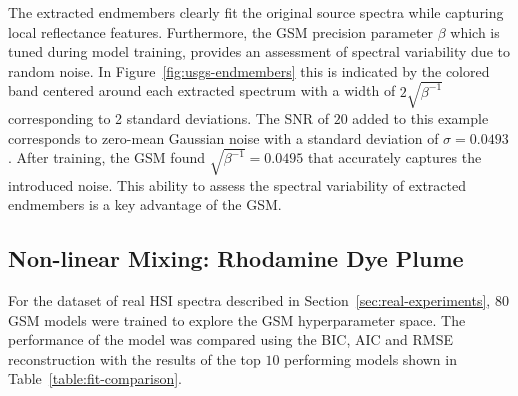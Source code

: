 The extracted endmembers clearly fit the original source spectra while capturing
local reflectance features. Furthermore, the GSM precision parameter $\beta$
which is tuned during model training, provides an assessment of spectral
variability due to random noise. In Figure~\ref{fig:usgs-endmembers} this is
indicated by the colored band centered around each extracted spectrum with a
width of $2\sqrt{\beta^{-1}}$ corresponding to 2 standard deviations. The SNR of
$20$ added to this example corresponds to zero-mean Gaussian noise with a
standard deviation of $\sigma=0.0493$. After training, the GSM found
$\sqrt{\beta^{-1}}=0.0495$ that accurately captures the introduced noise. This
ability to assess the spectral variability of extracted endmembers is a key
advantage of the GSM.


\subsection{Non-linear Mixing: Rhodamine Dye Plume}

For the dataset of real HSI spectra described in Section~\ref{sec:real-experiments},
80 GSM models were trained to explore the GSM hyperparameter space. The
performance of the model was compared using the BIC, AIC and RMSE reconstruction
with the results of the top $10$ performing models shown in
Table~\ref{table:fit-comparison}.

